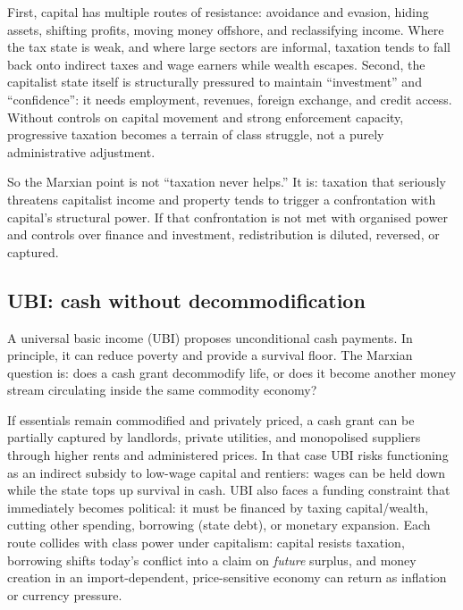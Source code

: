 First, capital has multiple routes of resistance: avoidance and evasion, hiding assets, shifting profits, moving money
offshore, and reclassifying income. Where the tax state is weak, and where large sectors are informal, taxation tends to
fall back onto indirect taxes and wage earners while wealth escapes. Second, the capitalist state itself is structurally
pressured to maintain ``investment'' and ``confidence'': it needs employment, revenues, foreign exchange, and credit
access. Without controls on capital movement and strong enforcement capacity, progressive taxation becomes a terrain of
class struggle, not a purely administrative adjustment.

So the Marxian point is not ``taxation never helps.'' It is: taxation that seriously threatens capitalist income and
property tends to trigger a confrontation with capital's structural power. If that confrontation is not met with organised
power and controls over finance and investment, redistribution is diluted, reversed, or captured.

\subsection{UBI: cash without decommodification}
\label{sec:policy-ubi}


A universal basic income (UBI) proposes unconditional cash payments. In principle, it can reduce poverty and provide
a survival floor. The Marxian question is: does a cash grant decommodify life, or does it become another money stream
circulating inside the same commodity economy?

If essentials remain commodified and privately priced, a cash grant can be partially captured by landlords, private
utilities, and monopolised suppliers through higher rents and administered prices. In that case UBI risks functioning
as an indirect subsidy to low-wage capital and rentiers: wages can be held down while the state tops up survival in cash.
UBI also faces a funding constraint that immediately becomes political: it must be financed by taxing capital/wealth,
cutting other spending, borrowing (state debt), or monetary expansion. Each route collides with class power under
capitalism: capital resists taxation, borrowing shifts today's conflict into a claim on \emph{future} surplus, and money
creation in an import-dependent, price-sensitive economy can return as inflation or currency pressure.

